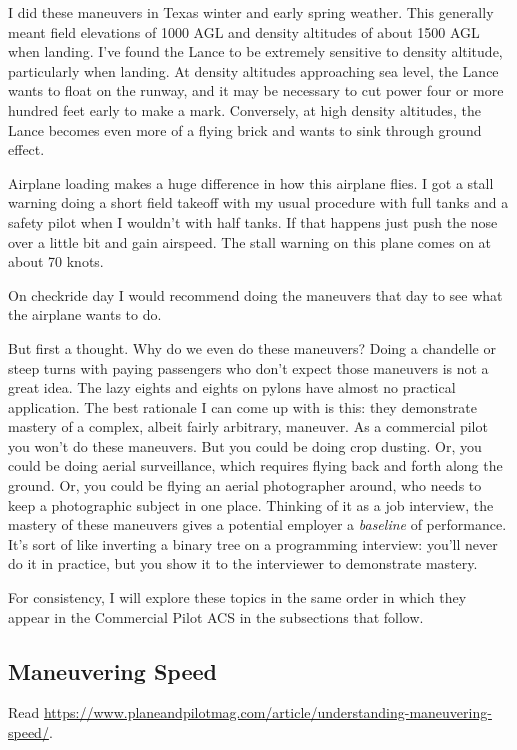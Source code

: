I did these maneuvers in Texas winter and early spring weather. This generally meant field elevations of 1000 AGL and density altitudes of about 1500 AGL when landing. I've found the Lance to be extremely sensitive to density altitude, particularly when landing. At density altitudes approaching sea level, the Lance wants to float on the runway, and it may be necessary to cut power four or more hundred feet early to make a mark. Conversely, at high density altitudes, the Lance becomes even more of a flying brick and wants to sink through ground effect.

Airplane loading makes a huge difference in how this airplane flies. I got a stall warning doing a short field takeoff with my usual procedure with full tanks and a safety pilot when I wouldn't with half tanks. If that happens just push the nose over a little bit and gain airspeed. The stall warning on this plane comes on at about 70 knots.

On checkride day I would recommend doing the maneuvers that day to see what the airplane wants to do.

But first a thought. Why do we even do these maneuvers? Doing a chandelle or steep turns with paying passengers who don't expect those maneuvers is not a great idea. The lazy eights and eights on pylons have almost no practical application. The best rationale I can come up with is this: they demonstrate mastery of a complex, albeit fairly arbitrary, maneuver. As a commercial pilot you won't do these maneuvers. But you could be doing crop dusting. Or, you could be doing aerial surveillance, which requires flying back and forth along the ground. Or, you could be flying an aerial photographer around, who needs to keep a photographic subject in one place. Thinking of it as a job interview, the mastery of these maneuvers gives a potential employer a \emph{baseline} of performance. It's sort of like inverting a binary tree on a programming interview: you'll never do it in practice, but you show it to the interviewer to demonstrate mastery.

For consistency, I will explore these topics in the same order in which they appear in the Commercial Pilot ACS in the subsections that follow.

\subsection{Maneuvering Speed}

Read \url{https://www.planeandpilotmag.com/article/understanding-maneuvering-speed/}.

